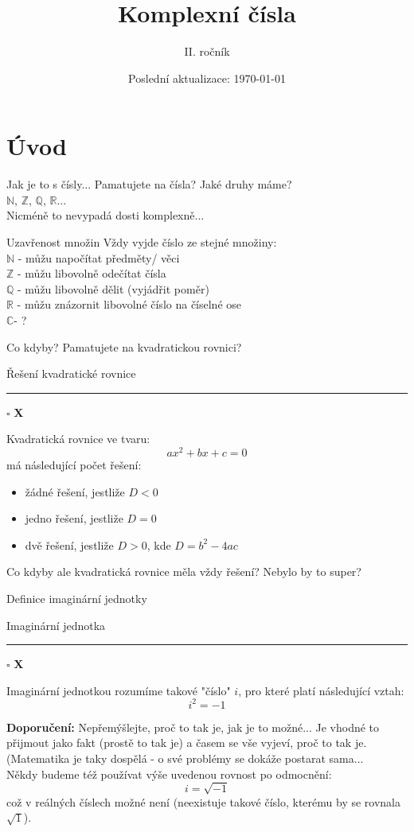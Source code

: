 \documentclass[aspectratio=169]{beamer} %
\title{Komplexní čísla}
\author{II. ročník}
\date{Poslední aktualizace: \today}
\newcommand{\ablock}[2]{\begin{alertblock}{#1 \hfill \rule{0.3cm}{0.4pt} \hspace{0.02cm} $\square$ \hspace{0.02cm} \textbf{X}} #2 \end{alertblock}}
\newcommand{\C}{$\mathbb{C}$}
\begin{document}
\maketitle

\section{Úvod}
	\begin{frame}{Jak je to s čísly...}
	 Pamatujete na čísla? Jaké druhy máme? \\[2ex]
	 $\mathbb{N}$, $\mathbb{Z}$, $\mathbb{Q}$, $\mathbb{R}$... \\[2ex]
	 Nicméně to nevypadá dosti komplexně... 
	\end{frame}
	
	\begin{frame}{Uzavřenost množin}
	Vždy vyjde číslo ze stejné množiny: \\[2ex]
	$\mathbb{N}$ - můžu napočítat předměty/ věci \\[2ex]
	$\mathbb{Z}$ - můžu libovolně odečítat čísla \\[2ex]
	$\mathbb{Q}$ - můžu libovolně dělit (vyjádřit poměr) \\[2ex]
	$\mathbb{R}$ - můžu znázornit libovolné číslo na číselné ose \\[2ex]
	\C  - ? 
	\end{frame}
		
	\begin{frame}{Co kdyby?}
	Pamatujete na kvadratickou rovnici?
		\ablock{Řešení kvadratické rovnice}{
		Kvadratická rovnice ve tvaru: $$ax^2+bx+c=0$$ má následující počet řešení: \\
			\begin{itemize}
			\item žádné řešení, jestliže $D<0$
			\item jedno řešení, jestliže $D=0$
			\item dvě řešení, jestliže $D>0$, kde $D=b^2-4ac$
			\end{itemize}}
		Co kdyby ale kvadratická rovnice měla vždy řešení? Nebylo by to super? 
	\end{frame}
	
	\begin{frame}{Definice imaginární jednotky}
		\ablock{Imaginární jednotka}{
		Imaginární jednotkou rozumíme takové "číslo" $i$, pro které platí následující vztah: $$i^2 = -1$$}
	\textbf{Doporučení:} Nepřemýšlejte, proč to tak je, jak je to možné... Je vhodné to přijmout jako fakt (prostě to tak je) a časem se vše vyjeví, proč to tak je. (Matematika je taky dospělá - o své problémy se dokáže postarat sama... \\[2ex]
	Někdy budeme též používat výše uvedenou rovnost po odmocnění: $$i=\sqrt{-1}$$ což v reálných číslech možné není (neexistuje takové číslo, kterému by se rovnala $\sqrt{1}$).
	\end{frame}
	
\end{document}
